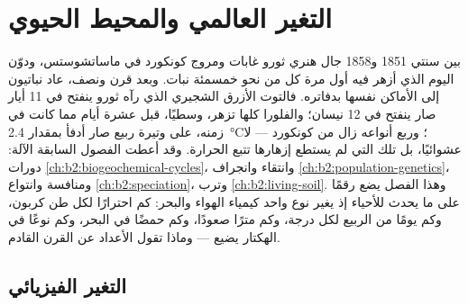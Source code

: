 \chapter{التغير العالمي والمحيط الحيوي}\label{ch:b2:global-change}

بين سنتي 1851 و1858 جال هنري ثورو غابات ومروج
كونكورد في ماساتشوستس، ودوّن اليوم الذي أزهر فيه أول مرة كل
من نحو خمسمئة نبات. وبعد قرن ونصف،
عاد نباتيون إلى الأماكن نفسها بدفاتره. فالتوت الأزرق
الشجيري الذي رآه ثورو ينفتح في 11 أيار صار ينفتح في
12 نيسان؛ والفلورا كلها تزهر، وسطيًا، قبل عشرة أيام
مما كانت في زمنه، على وتيرة ربيع صار أدفأ بمقدار \qty{2.4}{\celsius}؛
وربع أنواعه زال من كونكورد --- لا
عشوائيًا، بل تلك التي لم يستطع إزهارها تتبع
الحرارة. وقد أعطت الفصول السابقة الآلة: دورات
\cref{ch:b2:biogeochemical-cycles}، وانتقاء وانجراف
\cref{ch:b2:population-genetics}، ومنافسة وانتواع
\cref{ch:b2:speciation}، وترب \cref{ch:b2:living-soil}.
وهذا الفصل يضع رقمًا على ما يحدث للأحياء
إذ يغير نوع واحد كيمياء الهواء والبحر: كم
احترارًا لكل طن كربون، وكم يومًا من الربيع لكل
درجة، وكم مترًا صعودًا، وكم حمضًا في البحر، وكم
نوعًا في الهكتار يضيع --- وماذا تقول الأعداد عن
القرن القادم.

\section{التغير الفيزيائي}

